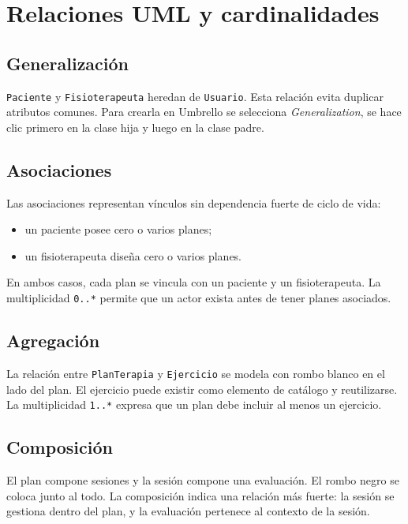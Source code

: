 \section{Relaciones UML y cardinalidades}
\subsection{Generalización}
\texttt{Paciente} y \texttt{Fisioterapeuta} heredan de \texttt{Usuario}. Esta relación evita duplicar atributos comunes. Para crearla en Umbrello se selecciona \textit{Generalization}, se hace clic primero en la clase hija y luego en la clase padre.

\subsection{Asociaciones}
Las asociaciones representan vínculos sin dependencia fuerte de ciclo de vida:
\begin{itemize}
  \item un paciente posee cero o varios planes;
  \item un fisioterapeuta diseña cero o varios planes.
\end{itemize}

En ambos casos, cada plan se vincula con un paciente y un fisioterapeuta. La multiplicidad \texttt{0..*} permite que un actor exista antes de tener planes asociados.

\subsection{Agregación}
La relación entre \texttt{PlanTerapia} y \texttt{Ejercicio} se modela con rombo blanco en el lado del plan. El ejercicio puede existir como elemento de catálogo y reutilizarse. La multiplicidad \texttt{1..*} expresa que un plan debe incluir al menos un ejercicio.

\subsection{Composición}
El plan compone sesiones y la sesión compone una evaluación. El rombo negro se coloca junto al todo. La composición indica una relación más fuerte: la sesión se gestiona dentro del plan, y la evaluación pertenece al contexto de la sesión.

